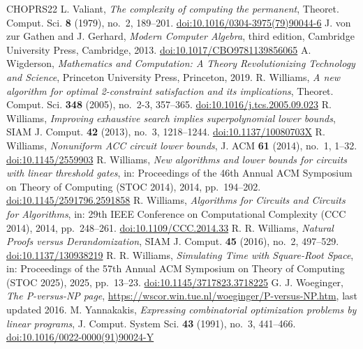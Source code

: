 \begin{thebibliography}{CHOPRS22}
 L. Valiant, \emph{The complexity of computing the permanent}, Theoret. Comput. Sci. \textbf{8} (1979), no.~2, 189--201. \href{https://doi.org/10.1016/0304-3975(79)90044-6}{doi:10.1016/0304-3975(79)90044-6}
 J. von zur Gathen and J. Gerhard, \emph{Modern Computer Algebra}, third edition, Cambridge University Press, Cambridge, 2013. \href{https://doi.org/10.1017/CBO9781139856065}{doi:10.1017/CBO9781139856065}
 A. Wigderson, \emph{Mathematics and Computation: A Theory Revolutionizing Technology and Science}, Princeton University Press, Princeton, 2019.
 R. Williams, \emph{A new algorithm for optimal 2-constraint satisfaction and its implications}, Theoret. Comput. Sci. \textbf{348} (2005), no.~2-3, 357--365. \href{https://doi.org/10.1016/j.tcs.2005.09.023}{doi:10.1016/j.tcs.2005.09.023}
 R. Williams, \emph{Improving exhaustive search implies superpolynomial lower bounds}, SIAM J. Comput. \textbf{42} (2013), no.~3, 1218--1244. \href{https://doi.org/10.1137/10080703X}{doi:10.1137/10080703X}
 R. Williams, \emph{Nonuniform ACC circuit lower bounds}, J. ACM \textbf{61} (2014), no.~1, 1--32. \href{https://doi.org/10.1145/2559903}{doi:10.1145/2559903}
 R. Williams, \emph{New algorithms and lower bounds for circuits with linear threshold gates}, in: Proceedings of the 46th Annual ACM Symposium on Theory of Computing (STOC 2014), 2014, pp.~194--202. \href{https://doi.org/10.1145/2591796.2591858}{doi:10.1145/2591796.2591858}
 R. Williams, \emph{Algorithms for Circuits and Circuits for Algorithms}, in: 29th IEEE Conference on Computational Complexity (CCC 2014), 2014, pp.~248--261. \href{https://doi.org/10.1109/CCC.2014.33}{doi:10.1109/CCC.2014.33}
 R. R. Williams, \emph{Natural Proofs versus Derandomization}, SIAM J. Comput. \textbf{45} (2016), no.~2, 497--529. \href{https://doi.org/10.1137/130938219}{doi:10.1137/130938219}
 R. R. Williams, \emph{Simulating Time with Square-Root Space}, in: Proceedings of the 57th Annual ACM Symposium on Theory of Computing (STOC 2025), 2025, pp.~13--23. \href{https://doi.org/10.1145/3717823.3718225}{doi:10.1145/3717823.3718225}
 G. J. Woeginger, \emph{The P-versus-NP page}, \url{https://wscor.win.tue.nl/woeginger/P-versus-NP.htm}, last updated 2016.
 M. Yannakakis, \emph{Expressing combinatorial optimization problems by linear programs}, J. Comput. System Sci. \textbf{43} (1991), no.~3, 441--466. \href{https://doi.org/10.1016/0022-0000(91)90024-Y}{doi:10.1016/0022-0000(91)90024-Y}

\end{thebibliography}
